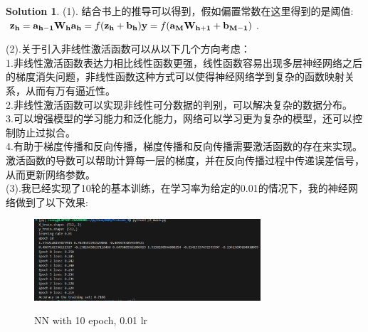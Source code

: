 \documentclass[a4paper,UTF8]{article}
\numberwithin{equation}{section}
\theoremstyle{definition}
\newtheorem*{solution}{Solution}
\begin{document}
\begin{solution} 
(1).
结合书上的推导可以得到，假如偏置常数在这里得到的是阈值:\\
$
\mathbf{z_h} = \mathbf{a_{h-1}} \mathbf{W_h} \\
\mathbf{a_h} = f(\mathbf{z_h} +  \mathbf{b_h})\\
\mathbf{y} = f(\mathbf{a_M}\mathbf{W_{h+1}} + \mathbf{b_{M-1}})
$.

(2).关于引入非线性激活函数可以从以下几个方向考虑：\\
1.非线性激活函数表达力相比线性函数更强，线性函数容易出现多层神经网络之后的梯度消失问题，非线性函数这种方式可以使得神经网络学到复杂的函数映射关系，从而有万有逼近性。\\
2.非线性激活函数可以实现非线性可分数据的判别，可以解决复杂的数据分布。\\
3.可以增强模型的学习能力和泛化能力，网络可以学习更为复杂的模型，还可以控制防止过拟合。\\
4.有助于梯度传播和反向传播，梯度传播和反向传播需要激活函数的存在来实现。激活函数的导数可以帮助计算每一层的梯度，并在反向传播过程中传递误差信号，从而更新网络参数。\\

(3).我已经实现了10轮的基本训练，在学习率为给定的0.01的情况下，我的神经网络做到了以下效果:\\
\begin{figure}[H]
    \centering
    \includegraphics[width=0.75\textwidth]{3.png}\\
    \caption{NN with 10 epoch, 0.01 lr}
    \label{fig:NN with 10 epoch, 0.01 lr}
\end{figure}  


\end{solution}
\end{document}
